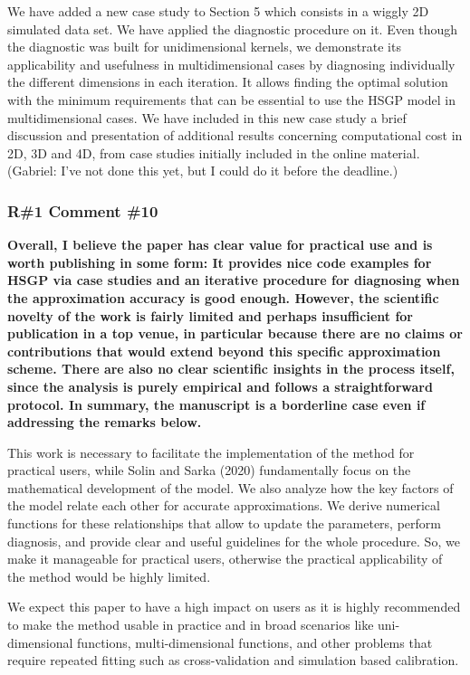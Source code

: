 \documentclass[11pt]{report}
\begin{document}
We have added a new case study to Section 5 which consists in a wiggly 2D simulated data set. We have applied the diagnostic procedure on it. Even though the diagnostic was built for unidimensional kernels, we demonstrate its applicability and usefulness in multidimensional cases by diagnosing individually the different dimensions in each iteration. It allows finding the  optimal solution with the minimum requirements that can be essential to use the HSGP model in multidimensional cases. We have included in this new case study a brief discussion and presentation of additional results concerning computational cost in 2D, 3D and 4D, from case studies initially included in the online material. {\color{red} (Gabriel: I've not done this yet, but I could do it before the deadline.)}

\subsubsection*{R\#1 Comment \#10}

\textbf{Overall, I believe the paper has clear value for practical use and is worth publishing in some form: It provides nice code examples for HSGP via case studies and an iterative procedure for diagnosing when the approximation accuracy is good enough. However, the scientific novelty of the work is fairly limited and perhaps insufficient for publication in a top venue, in particular because there are no claims or contributions that would extend beyond this specific approximation scheme. There are also no clear scientific insights in the process itself, since the analysis is purely empirical and follows a straightforward protocol. In summary, the manuscript is a borderline case even if addressing the remarks below.}

This work is necessary to facilitate the implementation of the method for practical users, while Solin and Sarka (2020) fundamentally focus on the mathematical development of the model. We also analyze how the key factors of the model relate each other for accurate approximations. We derive numerical functions for these relationships that allow to update the parameters, perform diagnosis, and provide clear and useful guidelines for the whole procedure. So, we make it manageable for practical users, otherwise the practical applicability of the method would be highly limited.

We expect this paper to have a high impact on users as it is highly recommended to make the method usable in practice and in broad scenarios like uni-dimensional functions, multi-dimensional functions, and other problems that require repeated fitting such as cross-validation and simulation based calibration.
\end{document}
